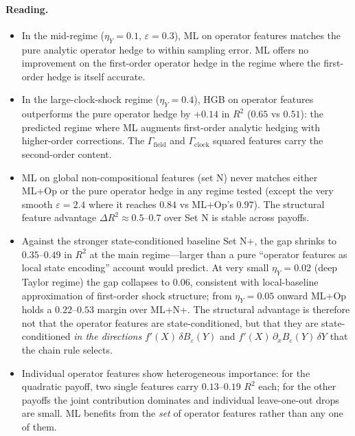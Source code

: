 \documentclass[11pt,reqno]{amsart}
\theoremstyle{plain}
\theoremstyle{definition}
\theoremstyle{remark}
\newcommand{\Bvar}{B}
\newcommand{\Yclock}{Y}
\begin{document}
\paragraph{Reading.}
\begin{itemize}
\item In the mid-regime ($\eta_{Y}=0.1$, $\varepsilon=0.3$),
ML on operator features matches the pure analytic operator
hedge to within sampling error. ML offers no improvement on
the first-order operator hedge in the regime where the
first-order hedge is itself accurate.
\item In the large-clock-shock regime ($\eta_{Y}=0.4$), HGB on
operator features outperforms the pure operator hedge by
$+0.14$ in $R^{2}$ ($0.65$ vs $0.51$): the predicted regime
where ML augments first-order analytic hedging with
higher-order corrections. The $\Gamma_{\mathrm{field}}$ and
$\Gamma_{\mathrm{clock}}$ squared features carry the
second-order content.
\item ML on global non-compositional features (set N) never
matches either ML+Op or the pure operator hedge in any regime
tested (except the very smooth $\varepsilon=2.4$ where it
reaches $0.84$ vs ML+Op's $0.97$). The structural feature
advantage $\Delta R^{2}\approx 0.5$--$0.7$ over Set N is
stable across payoffs.
\item Against the stronger state-conditioned baseline Set N+,
the gap shrinks to $0.35$--$0.49$ in $R^{2}$ at the main
regime---larger than a pure ``operator features as local state
encoding'' account would predict.
At very small $\eta_{Y}=0.02$ (deep Taylor regime) the gap
collapses to $0.06$, consistent with local-baseline approximation
of first-order shock structure; from $\eta_{Y}=0.05$ onward
ML+Op holds a $0.22$--$0.53$ margin over ML+N+. The structural
advantage is therefore not that the operator features are
state-conditioned, but that they are state-conditioned
\emph{in the directions} $f'(X)\,\delta\Bvar_{\varepsilon}(\Yclock)$
and
$f'(X)\,\partial_{x}\Bvar_{\varepsilon}(\Yclock)\,\delta\Yclock$
that the chain rule selects.
\item Individual operator features show heterogeneous
importance: for the quadratic payoff, two single features
carry $0.13$--$0.19$ $R^{2}$ each; for the other payoffs the
joint contribution dominates and individual leave-one-out
drops are small. ML benefits from the \emph{set} of operator
features rather than any one of them.
\end{itemize}
\end{document}
